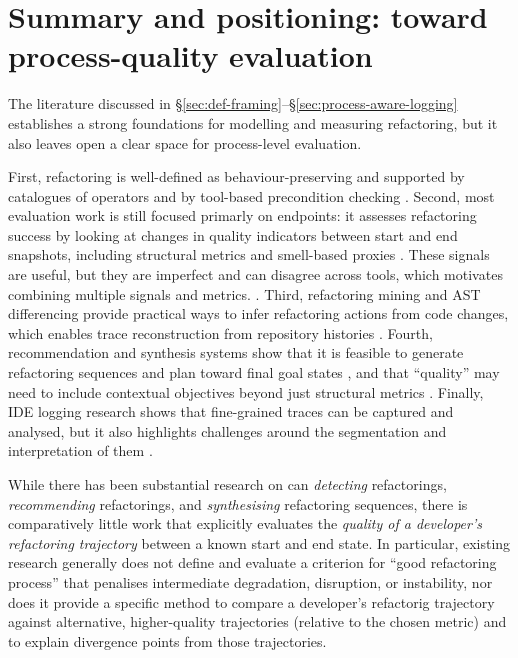 \section{Summary and positioning: toward process-quality evaluation}
\label{sec:background-summary}

The literature discussed in \S\ref{sec:def-framing}--\S\ref{sec:process-aware-logging} establishes a strong foundations for modelling and measuring refactoring, but it also leaves open a clear space for process-level evaluation.

First, refactoring is well-defined as behaviour-preserving and supported by catalogues of operators and by tool-based precondition checking \cite{opdyke1992refactoring,fowler1999refactoring,mens2004survey}. Second, most evaluation work is still focused primarly on endpoints: it assesses refactoring success by looking at changes in quality indicators between start and end snapshots, including structural metrics and smell-based proxies \cite{harman2007pareto,moha2010decor}. These signals are useful, but they are imperfect and can disagree across tools, which motivates combining multiple signals and metrics. \cite{paiva2017evaluation,arcellifontana2016falsepositives,scalabrino2018readability}. Third, refactoring mining and AST differencing provide practical ways to infer refactoring actions from code changes, which enables trace reconstruction from repository histories \cite{tsantalis2020refactoringminer,falleri2014gumtree}. Fourth, recommendation and synthesis systems show that it is feasible to generate refactoring sequences and plan toward final goal states \cite{raychev2013resynth,lin2016navigator,alizadeh2020interactive}, and that ``quality'' may need to include contextual objectives beyond just structural metrics \cite{wang2018traceability,whydevelopersrefactor2020,metricsmotivation2024}. Finally, IDE logging research shows that fine-grained traces can be captured and analysed, but it also highlights challenges around the segmentation and interpretation of them \cite{poncin2011processmining,damevski2017usagesmells,foutsekh2018interactiontraces}.

While there has been substantial research on can \emph{detecting} refactorings, \emph{recommending} refactorings, and \emph{synthesising} refactoring sequences, there is comparatively little work that explicitly evaluates the \emph{quality of a developer's refactoring trajectory} between a known start and end state. In particular, existing research generally does not define and evaluate a criterion for ``good refactoring process'' that penalises intermediate degradation, disruption, or instability, nor does it provide a specific method to compare a developer's refactorig trajectory against alternative, higher-quality trajectories (relative to the chosen metric) and to explain divergence points from those trajectories.

